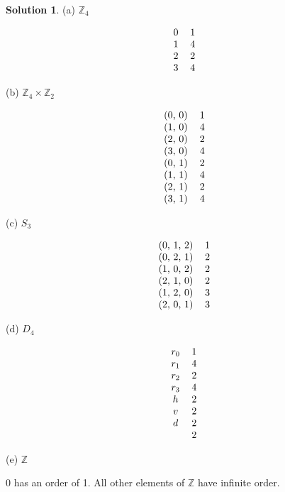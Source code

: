 \documentclass[12pt]{article}
\theoremstyle{definition}
\newtheorem*{soln}{Solution}
\newcommand{\ZZ}{{\mathbb{Z}}}
\begin{document}
\begin{soln}\quad

(a) $\ZZ_4$

\begin{equation*}
\begin{tabular}{c c}
0 & 1\\
1 & 4\\
2 & 2\\
3 & 4
\end{tabular}
\end{equation*}

(b) $\ZZ_4\times \ZZ_2$

\begin{equation*}
\begin{tabular}{c c}
(0, 0) & 1\\
(1, 0) & 4\\
(2, 0) & 2\\
(3, 0) & 4\\
(0, 1) & 2\\
(1, 1) & 4\\
(2, 1) & 2\\
(3, 1) & 4
\end{tabular}
\end{equation*}

(c) $S_3$

\begin{equation*}
\begin{tabular}{c c}
(0, 1, 2) & 1\\
(0, 2, 1) & 2\\
(1, 0, 2) & 2\\
(2, 1, 0) & 2\\
(1, 2, 0) & 3\\
(2, 0, 1) & 3
\end{tabular}
\end{equation*}

(d) $D_4$

\begin{equation*}
\begin{tabular}{c c}
$r_0$ & 1\\
$r_1$ & 4\\
$r_2$ & 2\\
$r_3$ & 4\\
$h$ & 2\\
$v$ & 2\\
$d$ & 2\\
$$ & 2 %
\end{tabular}
\end{equation*}

(e) $\ZZ$

0 has an order of 1.
All other elements of $\ZZ$ have infinite order.

\end{soln}
\end{document}
